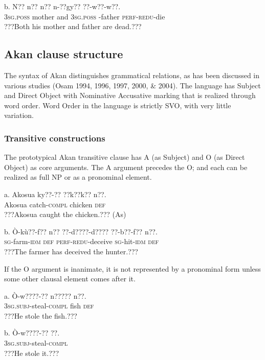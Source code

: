 \documentclass[output=paper]{langsci/langscibook}
\begin{document}
\ea
\gll  b.  N??    n??    n??  n-??gy??      ??-w??-w??.\\
       \textsc{3sg.poss}  mother    and  \textsc{3sg.poss} -father  \textsc{perf-redu}{}-die\\
\glt   ???Both his mother and father are dead.??? \citep[24]{Martin1936}
\z

\subsection{Akan clause structure}

The syntax of Akan distinguishes grammatical relations, as has been discussed in various studies (Osam 1994, 1996, 1997, 2000, \& 2004). The language has Subject and Direct Object with Nominative Accusative marking that is realized through word order. Word Order in the language is strictly SVO, with very little variation.

\subsubsection{Transitive constructions}

The prototypical Akan transitive clause has A (as Subject) and O (as Direct Object) as core arguments. The A argument precedes the O; and each can be realized as full NP or as a pronominal element.


\ea
\gll a.  Akosua    ky??-??    ??k??k??    n??.\\
       Akosua  catch-\textsc{compl}  chicken  \textsc{def}\\
\glt   ???Akosua caught the chicken.??? (As)
\z

\ea
\gll  b.  \`{O}-k\`{u}??-f??    n??  ??-d????-d????    ??{}-b??-f??    n??.\\
       \textsc{sg}{}-farm-\textsc{idm}    \textsc{def}  \textsc{perf-redu}{}-deceive  \textsc{sg}{}-hit-\textsc{idm}  \textsc{def}\\
\glt   ???The farmer has deceived the hunter.???
\z

If the O argument is inanimate, it is not represented by a pronominal form unless some other clausal element comes after it.

\ea
\gll a.  \`{O}-w????-??    n?????  n??.\\
       \textsc{3sg.subj}{}-steal-\textsc{compl}  fish  \textsc{def}\\
\glt   ???He stole the fish.???
\z

\ea
\gll  b.  \`{O}-w????-??      ??.\\
       \textsc{3sg.subj}{}-steal-\textsc{compl}\\
\glt   ???He stole it.???
\z
\end{document}

